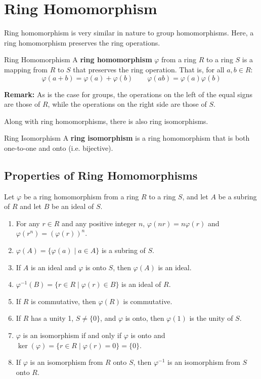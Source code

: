\documentclass[letterpaper]{article}
\begin{document}
\section{Ring Homomorphism}
Ring homomorphism is very similar in nature to group homomorphisms. Here, a ring homomorphism preserves the ring operations.

\begin{definition}{Ring Homomorphism}{}
    A \textbf{ring homomorphism} $\varphi$ from a ring $R$ to a ring $S$ is a mapping from $R$ to $S$ that preserves the ring operation. That is, for all $a, b \in R$:
    \[\varphi(a + b) = \varphi(a) + \varphi(b) \qquad \varphi(ab) = \varphi(a)\varphi(b)\]
\end{definition}
\textbf{Remark:} As is the case for groups, the operations on the left of the equal signs are those of $R$, while the operations on the right side are those of $S$. 

\bigskip

Along with ring homomorphisms, there is also ring isomorphisms.
\begin{definition}{Ring Isomorphism}{}
    A \textbf{ring isomorphism} is a ring homomorphism that is both one-to-one and onto (i.e. bijective).
\end{definition}

\subsection{Properties of Ring Homomorphisms}
\begin{theorem}{}{}
    Let $\varphi$ be a ring homomorphism from a ring $R$ to a ring $S$, and let $A$ be a subring of $R$ and let $B$ be an ideal of $S$.
    \begin{enumerate}
        \item For any $r \in R$ and any positive integer $n$, $\varphi(nr) = n\varphi(r)$ and $\varphi(r^n) = (\varphi(r))^n$.
        \item $\varphi(A) = \{\varphi(a) \mid a \in A\}$ is a subring of $S$. 
        \item If $A$ is an ideal and $\varphi$ is onto $S$, then $\varphi(A)$ is an ideal. 
        \item $\varphi^{-1}(B) = \{r \in R \mid \varphi(r) \in B\}$ is an ideal of $R$. 
        \item If $R$ is commutative, then $\varphi(R)$ is commutative.
        \item If $R$ has a unity 1, $S \neq \{0\}$, and $\varphi$ is onto, then $\varphi(1)$ is the unity of $S$. 
        \item $\varphi$ is an isomorphism if and only if $\varphi$ is onto and $\ker(\varphi) = \{r \in R \mid \varphi(r) = 0\} = \{0\}$. 
        \item If $\varphi$ is an isomorphism from $R$ onto $S$, then $\varphi^{-1}$ is an isomorphism from $S$ onto $R$. 
    \end{enumerate}
\end{theorem}
\end{document}
